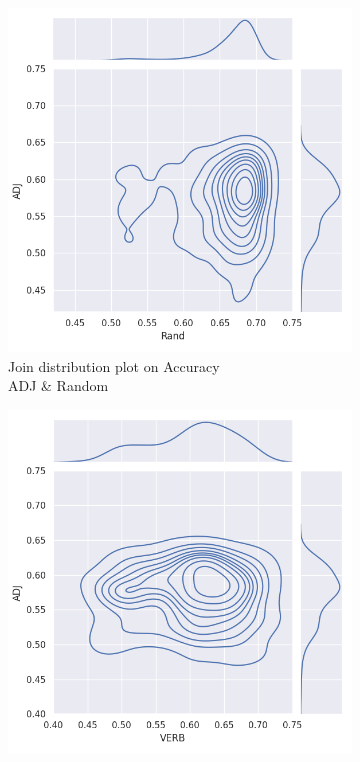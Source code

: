 \documentclass[12pt]{article}
\begin{document}
\begin{figure} [!h] 
\begin{subfigure}[h]{0.3\linewidth} 
\includegraphics[width=\linewidth]{figures/merge_adj_rand_joinplot.png}
\caption{Join distribution plot on Accuracy\\ADJ \& Random}
\end{subfigure}
\hfill
\begin{subfigure}[h]{0.3\linewidth} 
\includegraphics[width=\linewidth]{figures/merge_adj_verb_joinplot.png}

\end{subfigure}
\end{figure}
\end{document}
